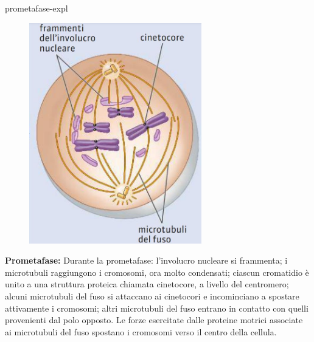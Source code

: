 \documentclass[preview]{standalone}
\begin{document}
\begin{snippet}{prometafase-expl}
    \setlength{\intextsep}{0pt}%
    \begin{figure}
        \includegraphics[width=7.5cm]{./resources/prometafase.jpg}
        \vspace{-1cm}
    \end{figure}

    \textbf{Prometafase:}
    Durante la prometafase: l'involucro nucleare si frammenta; i microtubuli raggiungono i
    cromosomi, ora molto condensati; ciascun cromatidio è unito a una struttura proteica
    chiamata cinetocore, a livello del centromero; alcuni microtubuli del fuso si attaccano ai
    cinetocori e incominciano a spostare attivamente i cromosomi; altri microtubuli del fuso
    entrano in contatto con quelli provenienti dal polo opposto. Le forze esercitate dalle proteine
    motrici associate ai microtubuli del fuso spostano i cromosomi verso il centro della cellula.
    \wrapfill
\end{snippet}
\end{document}
